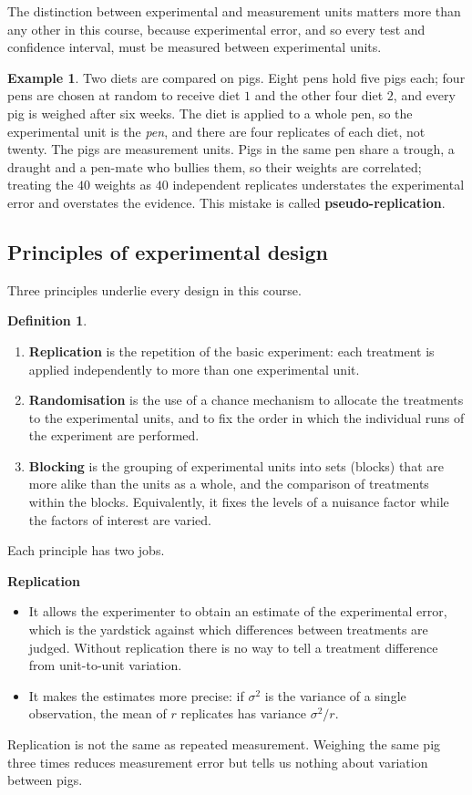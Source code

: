 \documentclass[11pt,a4paper]{article}
\numberwithin{equation}{section}
\theoremstyle{definition}
\newtheorem{defn}[thm]{Definition}
\newtheorem{exa}[thm]{Example}
\newcommand{\subhead}[1]{%
  \par\medskip\noindent\textbf{#1}\par\nobreak\smallskip}
\begin{document}
The distinction between experimental and measurement units matters more than any other in this course, because experimental error, and
so every test and confidence interval, must be measured between experimental units.

\begin{exa}\label{exa:pens}
Two diets are compared on pigs. Eight pens hold five pigs each; four pens are chosen at random to receive diet $1$ and the other four diet $2$,
and every pig is weighed after six weeks. The diet is applied to a whole pen, so the experimental unit is the \emph{pen}, and there are four
replicates of each diet, not twenty. The pigs are measurement units. Pigs in the same pen share a trough, a draught and a pen-mate who
bullies them, so their weights are correlated; treating the $40$ weights as $40$ independent replicates understates the experimental error and
overstates the evidence. This mistake is called \textbf{pseudo-replication}.
\end{exa}

\subsection{Principles of experimental design}
Three principles underlie every design in this course.

\begin{defn}
\begin{enumerate}[label=(\roman*)]
\item \textbf{Replication} is the repetition of the basic experiment: each treatment is applied independently to more than one experimental
unit.
\item \textbf{Randomisation} is the use of a chance mechanism to allocate the treatments to the experimental units, and to fix the order in
which the individual runs of the experiment are performed.
\item \textbf{Blocking} is the grouping of experimental units into sets (blocks) that are more alike than the units as a whole, and the
comparison of treatments within the blocks. Equivalently, it fixes the levels of a nuisance factor while the factors of interest are varied.
\end{enumerate}
\end{defn}

Each principle has two jobs.

\subhead{Replication}
\begin{itemize}
\item It allows the experimenter to obtain an estimate of the experimental error, which is the yardstick against which differences between
treatments are judged. Without replication there is no way to tell a treatment difference from unit-to-unit variation.
\item It makes the estimates more precise: if $\sigma^2$ is the variance of a single observation, the mean of $r$ replicates has variance
$\sigma^2/r$.
\end{itemize}
Replication is not the same as repeated measurement. Weighing the same pig three times reduces measurement error but tells us nothing about
variation between pigs.
\end{document}
